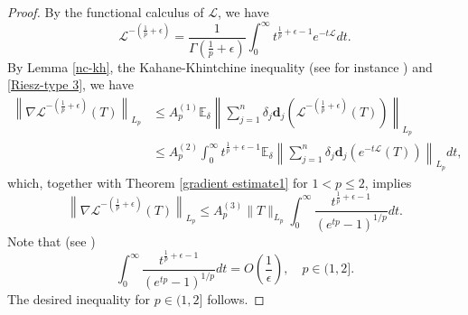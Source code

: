 \documentclass{amsbook}
\theoremstyle{definition}
\theoremstyle{remark}
\numberwithin{section}{chapter}
\numberwithin{equation}{chapter}
\newcommand{\1}{\mathbf{1}}
\newcommand{\dc}{\mathbf{d}}
\begin{document}
\begin{proof}
By the functional calculus of $\mathcal{L}$, we have
\begin{equation}\label{Riesz-type 3}
\mathcal{L}^{-(\frac{1}{p}+\epsilon)}=\frac{1}{\Gamma(\frac{1}{p}+\epsilon)}\int_{0}^{\infty}t^{\frac{1}{p}+\epsilon-1}e^{-t\mathcal{L}}dt.
\end{equation}
By Lemma \ref{nc-kh}, the Kahane-Khintchine inequality (see for instance \cite{Pi2016})  and \eqref{Riesz-type 3}, we have
\begin{equation}\label{eq Delta 1}
\begin{aligned}
\left\|\nabla \mathcal{L}^{-(\frac{1}{p}+\epsilon)}(T)\right\|_{L_{p}}&\leq A^{(1)}_{p}\mathbb{E}_{\delta}\left\|\sum_{j=1}^{n}\delta_{j}\dc_{j}\left(\mathcal{L}^{-(\frac{1}{p}+\epsilon)}(T)\right)\right\|_{L_p}\\
&\leq A^{(2)}_{p}\int_{0}^{\infty}t^{\frac{1}{p}+\epsilon-1}\mathbb{E}_{\delta}\left\|\sum_{j=1}^{n}\delta_{j}\dc_{j}(e^{-t\mathcal{L}}(T))\right\|_{L_{p}}dt,
\end{aligned}
\end{equation}
which, together with Theorem \ref{gradient estimate1} for $1<p\leq 2$, implies
$$\left\|\nabla \mathcal{L}^{-(\frac{1}{p}+\epsilon)}(T)\right\|_{L_{p}}\leq A^{(3)}_{p}\|T\|_{L_{p}}\int_{0}^{\infty}\frac{t^{\frac{1}{p}+\epsilon-1}}{(e^{tp}-1)^{1/p}}dt.$$
Note that (see \cite[eq. (214)]{EI2020})
$$\int_{0}^{\infty}\frac{t^{\frac{1}{p}+\epsilon-1}}{(e^{tp}-1)^{1/p}}dt=O(\frac{1}{\epsilon}),\quad p\in (1,2].$$
The desired inequality for $p\in(1,2]$ follows. 


\end{proof}
\end{document}
